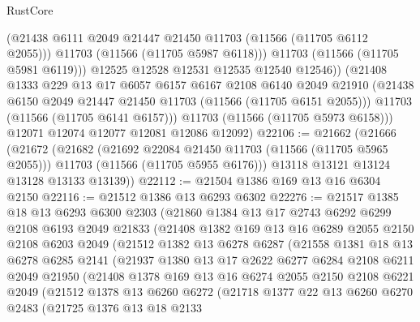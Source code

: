 \begin{lexlean}{RustCore}
\begin{coremodule}
                (@21438 @6111 @2049 @21447 @21450 @11703 (@11566 (@11705 @6112 @2055)))
                @11703
                (@11566 (@11705 @5987 @6118)))
              @11703
              (@11566 (@11705 @5981 @6119)))
            @12525
            @12528
            @12531
            @12535
            @12540
            @12546))
        (@21408
          @1333
          @229
          @13
          @17
          @6057
          @6157
          @6167
          @2108
          @6140
          @2049
          @21910
          (@21438 @6150 @2049 @21447 @21450 @11703 (@11566 (@11705 @6151 @2055)))
          @11703
          (@11566 (@11705 @6141 @6157)))
        @11703
        (@11566 (@11705 @5973 @6158)))
      @12071
      @12074
      @12077
      @12081
      @12086
      @12092)
@22106 := @21662
    (@21666
      (@21672
        (@21682
          (@21692 @22084 @21450 @11703 (@11566 (@11705 @5965 @2055)))
          @11703
          (@11566 (@11705 @5955 @6176)))
        @13118
        @13121
        @13124
        @13128
        @13133
        @13139))
@22112 := @21504 @1386 @169 @13 @16 @6304 @2150
@22116 := @21512 @1386 @13 @6293 @6302
@22276 := @21517
    @1385
    @18
    @13
    @6293
    @6300
    @2303
    (@21860
      @1384
      @13
      @17
      @2743
      @6292
      @6299
      @2108
      @6193
      @2049
      @21833
      (@21408
        @1382
        @169
        @13
        @16
        @6289
        @2055
        @2150
        @2108
        @6203
        @2049
        (@21512
          @1382
          @13
          @6278
          @6287
          (@21558
            @1381
            @18
            @13
            @6278
            @6285
            @2141
            (@21937
              @1380
              @13
              @17
              @2622
              @6277
              @6284
              @2108
              @6211
              @2049
              @21950
              (@21408
                @1378
                @169
                @13
                @16
                @6274
                @2055
                @2150
                @2108
                @6221
                @2049
                (@21512
                  @1378
                  @13
                  @6260
                  @6272
                  (@21718
                    @1377
                    @22
                    @13
                    @6260
                    @6270
                    @2483
                    (@21725
                      @1376
                      @13
                      @18
                      @2133

\end{coremodule}
\end{lexlean}
